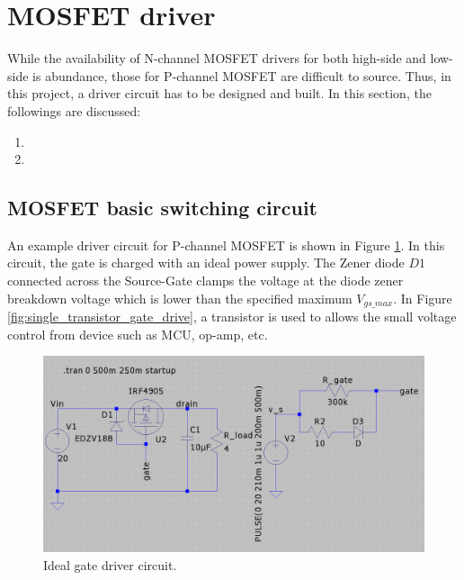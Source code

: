 \documentclass[../main.tex]{subfiles}
\begin{document}
    \section{MOSFET driver}
    \justify
    While the availability of N-channel MOSFET drivers for both high-side and low-side is abundance, those for P-channel MOSFET are difficult to source. Thus, in this project, a driver circuit has to be designed and built. In this section, the followings are discussed:
    \begin{enumerate}
        \item {}
        \item {}
    \end{enumerate}   

    \pagebreak
    \subsection{MOSFET basic switching circuit}  \label{sec:basic_switch_principle}
    
    An example driver circuit for P-channel MOSFET is shown in Figure \ref{fig:ideal_gate_drive}. In this circuit, the gate is charged with an ideal power supply. The Zener diode $D1$ connected across the Source-Gate clamps the voltage at the diode zener breakdown voltage which is lower than the specified maximum $V_{gs\_max}$. In Figure \ref{fig:single_transistor_gate_drive}, a transistor is used to allows the small voltage control from device such as MCU, op-amp, etc.

    \begin{figure}[!h]
        \centerline{\includegraphics[width=\linewidth]{media/ideal_gate_drive.png}}
        \caption{Ideal gate driver circuit.}
        \label{fig:ideal_gate_drive}
    \end{figure}
\end{document}
